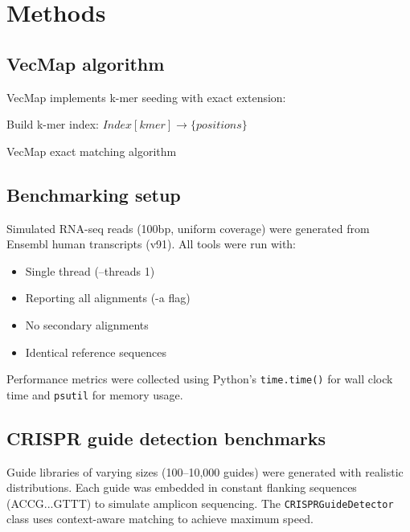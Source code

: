 \documentclass[12pt]{article}
\begin{document}
\section{Methods}

\subsection{VecMap algorithm}

VecMap implements k-mer seeding with exact extension:

\begin{algorithm}[H]
\SetAlgoLined
{}
Build k-mer index: $Index[kmer] \rightarrow \{positions\}$\;
\caption{VecMap exact matching algorithm}
\end{algorithm}

\subsection{Benchmarking setup}

Simulated RNA-seq reads (100bp, uniform coverage) were generated from Ensembl human transcripts (v91). All tools were run with:
\begin{itemize}
\item Single thread (--threads 1)
\item Reporting all alignments (-a flag)
\item No secondary alignments
\item Identical reference sequences
\end{itemize}

Performance metrics were collected using Python's \texttt{time.time()} for wall clock time and \texttt{psutil} for memory usage.

\subsection{CRISPR guide detection benchmarks}

Guide libraries of varying sizes (100--10,000 guides) were generated with realistic distributions. Each guide was embedded in constant flanking sequences (ACCG...GTTT) to simulate amplicon sequencing. The \texttt{CRISPRGuideDetector} class uses context-aware matching to achieve maximum speed.
\end{document}
